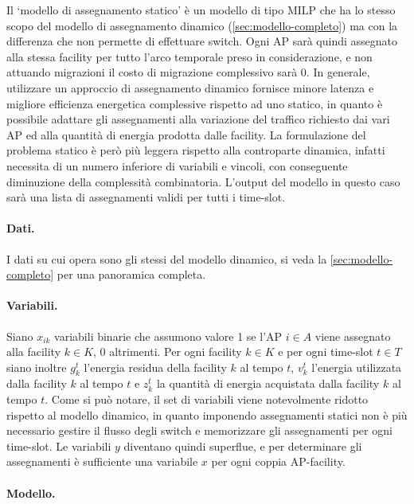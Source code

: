 Il `modello di assegnamento statico' è un modello di tipo MILP che ha lo stesso scopo del modello di assegnamento dinamico (\ref{sec:modello-completo}) ma con la differenza che non permette di effettuare switch. Ogni AP sarà quindi assegnato alla stessa facility per tutto l'arco temporale preso in considerazione, e non attuando migrazioni il costo di migrazione complessivo sarà 0. In generale, utilizzare un approccio di assegnamento dinamico fornisce minore latenza e migliore efficienza energetica complessive rispetto ad uno statico, in quanto è possibile adattare gli assegnamenti alla variazione del traffico richiesto dai vari AP ed alla quantità di energia prodotta dalle facility. La formulazione del problema statico è però più leggera rispetto alla controparte dinamica, infatti necessita di un numero inferiore di variabili e vincoli, con conseguente diminuzione della complessità combinatoria. L'output del modello in questo caso sarà una lista di assegnamenti validi per tutti i time-slot.

\paragraph*{Dati.}

I dati su cui opera sono gli stessi del modello dinamico, si veda la \autoref{sec:modello-completo} per una panoramica completa.

\paragraph*{Variabili.}

Siano $x_{ik}$ variabili binarie che assumono valore 1 se l'AP $i \in A$ viene assegnato alla facility $k \in K$, 0 altrimenti. Per ogni facility $k \in K$ e per ogni time-slot $t \in T$ siano inoltre $g^t_k$ l'energia residua della facility $k$ al tempo $t$, $v^t_k$ l'energia utilizzata dalla facility $k$ al tempo $t$ e $z^t_k$ la quantità di energia acquistata dalla facility $k$ al tempo $t$. Come si può notare, il set di variabili viene notevolmente ridotto rispetto al modello dinamico, in quanto imponendo assegnamenti statici non è più necessario gestire il flusso degli switch e memorizzare gli assegnamenti per ogni time-slot. Le variabili $y$ diventano quindi superflue, e per determinare gli assegnamenti è sufficiente una variabile $x$ per ogni coppia AP-facility.

\paragraph*{Modello.}

